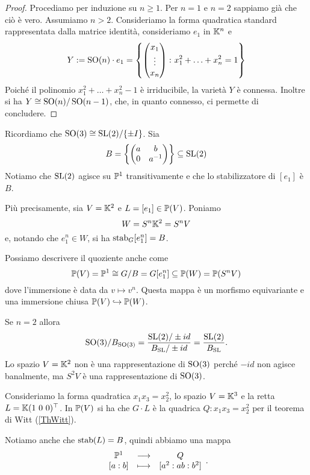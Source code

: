 \begin{proof}
Procediamo per induzione su $n\ge 1$. Per $n=1$ e $n=2$ sappiamo già che ciò è vero. Assumiamo $n>2$. Consideriamo la forma quadratica standard rappresentata dalla matrice identità, consideriamo $e_1$ in $\mathbb{K}^n$ e 
\[Y:= \operatorname{SO}(n)\cdot e_1=\left\{ \begin{pmatrix}
        x_1 \\ \vdots \\ x_n 
    \end{pmatrix} \colon x_1^2+\ldots+x_n^2=1\right\}\] 
Poiché il polinomio $x_1^2+\ldots+x_n^2-1$ è irriducibile, la varietà $Y$ è connessa. Inoltre si ha $Y\cong \operatorname{SO}(n)/\operatorname{SO}(n-1)$, che, in quanto connesso, ci permette di concludere.
\end{proof}



Ricordiamo che $\operatorname{SO}(3)\cong \mathrm{SL}(2)/\{\pm I\}$.
Sia 
\[B=\left\{{\begin{pmatrix}a&b\\0&a^{-1}\end{pmatrix}}\right\}\subseteq \mathrm{SL}(2)\]
Notiamo che $\mathrm{SL}(2)$ agisce su $\mathbb{P}^1$ transitivamente e che lo stabilizzatore di $[e_1]$ \`e $B$.


Pi\`u precisamente, sia $V=\mathbb{K}^2$ e $L=[e_1]\in\mathbb{P}(V)$. Poniamo
\[W=S^n\mathbb{K}^2=S^nV\]
e, notando che $e_1^n\in W$, si ha $\operatorname{stab}_G[e_1^n]=B$.

Possiamo descrivere il quoziente anche come
\[\mathbb{P}(V)=\mathbb{P}^1\cong G/B=G[e_1^n]\subseteq \mathbb{P}(W)=\mathbb{P}(S^n V)\]
dove l'immersione \`e data da $v\mapsto v^n$. Questa mappa \`e un morfismo equivariante e una immersione chiusa $\mathbb{P}(V)\hookrightarrow \mathbb{P}(W)$.



\begin{remark}
Se $n=2$ allora
\[\operatorname{SO}(3)/B_{\operatorname{SO}(3)}=\frac{\mathrm{SL}(2)/\pm id}{B_{\mathrm{SL}}/\pm id}=\frac{\mathrm{SL}(2)}{B_{\mathrm{SL}}}.\]
Lo spazio $V=\mathbb{K}^2$ non \`e una rappresentazione di $\operatorname{SO}(3)$ perch\'e $-id$ non agisce banalmente, ma $S^2V$ \`e una rappresentazione di $\operatorname{SO}(3)$.
\end{remark}



\begin{example}
Consideriamo la forma quadratica $x_1x_3=x_2^2$, lo spazio $V=\mathbb{K}^3$ e la retta $L=\mathbb{K}(1\ 0\ 0)^\top$. In $\mathbb{P}(V)$ si ha che $G\cdot L$ \`e la quadrica $Q:x_1x_3=x_2^2$ per il teorema di Witt (\ref{ThWitt}).

Notiamo anche che $\operatorname{stab}(L)=B$, quindi abbiamo una mappa
\[\begin{array}{ccc} {\mathbb{P}^1} & \longrightarrow & {Q}\\ {[a:b]} & \longmapsto & {[a^2:ab:b^2]} \end{array}.\]
\end{example}







